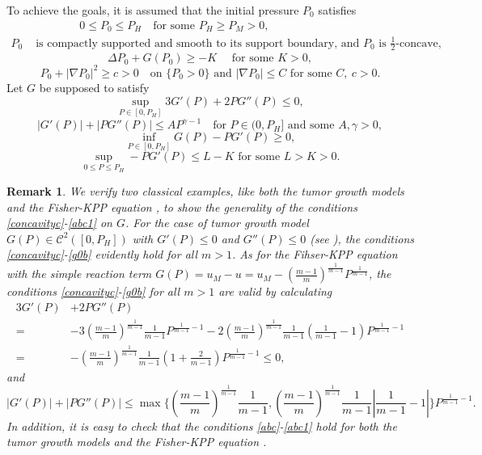 \documentclass[10pt]{article}         %
\newtheorem{remark}{Remark}[section]
\numberwithin{equation}{section}
\begin{document}
To achieve the goals, it is assumed that the initial pressure $P_0$ satisfies 
\begin{equation}\label{ini}
\begin{aligned}
&\ \ \ \ \ \ \  \ \ \ \  \ \ \ \ \ \ \ \ 0\leq P_0\leq P_H\quad\text{for some }P_H\geq P_M>0,\\
P_0& \text{ is compactly supported and smooth to its support boundary, and }P_0 \text{ is }\frac{1}{2}\text{-concave},
\end{aligned}
\end{equation}
\begin{equation}\label{ini2}
\Delta P_0+G(P_0)\geq -K\quad\text{ for some }K>0,
\end{equation}
\begin{equation}\label{ini3}
P_0+|\nabla P_0|^2\geq c>0\quad\text{on }\{P_0>0\}\text{ and }|\nabla P_0|\leq C \text{ for some }C,\ c>0.
\end{equation}
Let $G$ be supposed to satisfy
\begin{equation}\label{concavityc}
\sup\limits_{P\in[0,P_H]}3G'(P)+2PG''(P)\leq 0,
\end{equation}
\begin{equation}\label{g0b}
|G'(P)|+|PG''(P)|\leq AP^{\gamma-1}\quad \text{for }P\in(0,P_H] \text{ and some }A, \gamma>0,
\end{equation}
\begin{equation}\label{abc}
\inf\limits_{P\in[0,P_H]}G(P)-PG'(P)\geq 0,
\end{equation}
\begin{equation}\label{abc1}
\sup\limits_{0\leq P\leq P_H}-PG'(P)\leq L-K\text{ for some }L>K>0.
\end{equation}
\begin{remark}We verify two classical examples, like both the tumor growth models \cite{PERTHAME2014} and the Fisher-KPP equation \cite{DQZ2020}, to show the generality of the conditions \eqref{concavityc}-\eqref{abc1} on $G$. For the case of  tumor growth model $G(P)\in\mathcal{C}^2([0,P_H])$  with $G'(P)\leq 0$ and $G''(P)\leq 0$ (see \cite{PERTHAME2014}), the conditions \eqref{concavityc}-\eqref{g0b} evidently hold for all $m>1$. As for the Fihser-KPP equation with the simple reaction term  $G(P)=u_M-u=u_M-(\frac{m-1}{m})^{\frac{1}{m-1}}P^{\frac{1}{m-1}}$,  the conditions \eqref{concavityc}-\eqref{g0b} for all $m>1$ are valid by calculating
\[\begin{aligned}3G'(P)&+2PG''(P)\\
=&-3(\frac{m-1}{m})^{\frac{1}{m-1}}\frac{1}{m-1}P^{\frac{1}{m-1}-1}-2(\frac{m-1}{m})^{\frac{1}{m-1}}\frac{1}{m-1}(\frac{1}{m-1}-1)P^{\frac{1}{m-1}-1}\\
=&-(\frac{m-1}{m})^{\frac{1}{m-1}}\frac{1}{m-1}(1+\frac{2}{m-1})P^{\frac{1}{m-1}-1}\leq 0,
\end{aligned}\]
and 
\[ |G'(P)|+|PG''(P)|\leq \max\{(\frac{m-1}{m})^{\frac{1}{m-1}}\frac{1}{m-1},(\frac{m-1}{m})^{\frac{1}{m-1}}\frac{1}{m-1}|\frac{1}{m-1}-1|\}P^{\frac{1}{m-1}-1}.\]
In addition, it is easy to check that the conditions \eqref{abc}-\eqref{abc1} hold for both the tumor growth models \cite{PERTHAME2014} and the Fisher-KPP equation \cite{DQZ2020}.

\end{remark}
\end{document}

